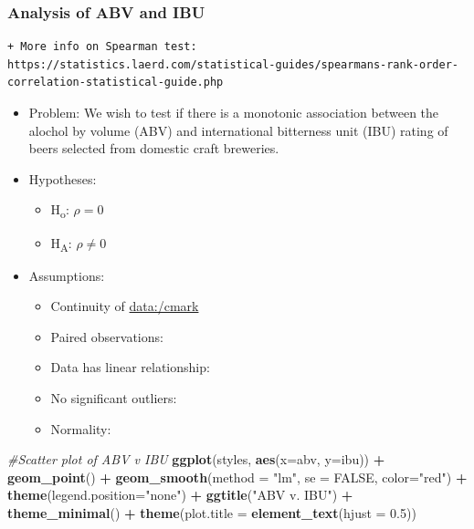 \documentclass[]{article}
\newenvironment{Shaded}{\begin{snugshade}}{\end{snugshade}}
\newcommand{\KeywordTok}[1]{\textcolor[rgb]{0.13,0.29,0.53}{\textbf{#1}}}
\newcommand{\DataTypeTok}[1]{\textcolor[rgb]{0.13,0.29,0.53}{#1}}
\newcommand{\FloatTok}[1]{\textcolor[rgb]{0.00,0.00,0.81}{#1}}
\newcommand{\StringTok}[1]{\textcolor[rgb]{0.31,0.60,0.02}{#1}}
\newcommand{\CommentTok}[1]{\textcolor[rgb]{0.56,0.35,0.01}{\textit{#1}}}
\newcommand{\OtherTok}[1]{\textcolor[rgb]{0.56,0.35,0.01}{#1}}
\newcommand{\OperatorTok}[1]{\textcolor[rgb]{0.81,0.36,0.00}{\textbf{#1}}}
\newcommand{\NormalTok}[1]{#1}
\providecommand{\tightlist}{%
  \setlength{\itemsep}{0pt}\setlength{\parskip}{0pt}}
\newcommand{\cmark}{\Large\textcolor{green}{\ding{52}}}
\newcommand{\xmark}{\Large\textcolor{red}{\ding{55}}}
\begin{document}
\subsubsection{Analysis of ABV and IBU}\label{analysis-of-abv-and-ibu}

\begin{verbatim}
+ More info on Spearman test: https://statistics.laerd.com/statistical-guides/spearmans-rank-order-correlation-statistical-guide.php
\end{verbatim}

\begin{itemize}
\item
  Problem: We wish to test if there is a monotonic association between
  the alochol by volume (ABV) and international bitterness unit (IBU)
  rating of beers selected from domestic craft breweries.
\item
  Hypotheses:

  \begin{itemize}
  \tightlist
  \item
    H\textsubscript{o}: \(\rho= 0\)
  \item
    H\textsubscript{A}: \(\rho\neq 0\)
  \end{itemize}
\end{itemize}

\begin{itemize}
\tightlist
\item
  Assumptions:

  \begin{itemize}
  \tightlist
  \item
    Continuity of \url{data:/cmark}
  \item
    Paired observations: \cmark
  \item
    Data has linear relationship: \cmark 
  \item
    No significant outliers: \xmark
  \item
    Normality: \xmark
  \end{itemize}
\end{itemize}

\begin{Shaded}
\begin{Highlighting}[]
\CommentTok{#Scatter plot of ABV v IBU}
\KeywordTok{ggplot}\NormalTok{(styles, }\KeywordTok{aes}\NormalTok{(}\DataTypeTok{x=}\NormalTok{abv, }\DataTypeTok{y=}\NormalTok{ibu)) }\OperatorTok{+}
\StringTok{  }\KeywordTok{geom_point}\NormalTok{() }\OperatorTok{+}
\StringTok{  }\KeywordTok{geom_smooth}\NormalTok{(}\DataTypeTok{method =} \StringTok{"lm"}\NormalTok{, }\DataTypeTok{se =} \OtherTok{FALSE}\NormalTok{, }\DataTypeTok{color=}\StringTok{"red"}\NormalTok{) }\OperatorTok{+}
\StringTok{  }\KeywordTok{theme}\NormalTok{(}\DataTypeTok{legend.position=}\StringTok{"none"}\NormalTok{) }\OperatorTok{+}
\StringTok{  }\KeywordTok{ggtitle}\NormalTok{(}\StringTok{"ABV v. IBU"}\NormalTok{) }\OperatorTok{+}
\StringTok{  }\KeywordTok{theme_minimal}\NormalTok{()  }\OperatorTok{+}
\StringTok{  }\KeywordTok{theme}\NormalTok{(}\DataTypeTok{plot.title =} \KeywordTok{element_text}\NormalTok{(}\DataTypeTok{hjust =} \FloatTok{0.5}\NormalTok{))}
\end{Highlighting}
\end{Shaded}
\end{document}
